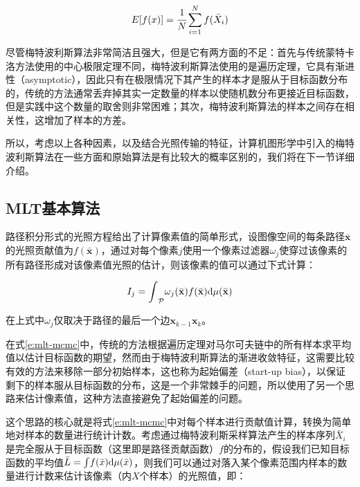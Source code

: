 \begin{equation}\label{e:mlt-mcmc}
	E[f(x)]= \cfrac{1}{N}\sum^{N}_{i=1}f(\bar{X}_i)
\end{equation}

尽管梅特波利斯算法非常简洁且强大，但是它有两方面的不足：首先与传统蒙特卡洛方法使用的中心极限定理不同，梅特波利斯算法使用的是遍历定理，它具有渐进性（asymptotic），因此只有在极限情况下其产生的样本才是服从于目标函数分布的，传统的方法通常丢弃掉其实一定数量的样本以使随机数分布更接近目标函数，但是实践中这个数量的取舍则非常困难；其次，梅特波利斯算法的样本之间存在相关性，这增加了样本的方差。

所以，考虑以上各种因素，以及结合光照传输的特征，计算机图形学中引入的梅特波利斯算法在一些方面和原始算法是有比较大的概率区别的，我们将在下一节详细介绍。






\subsection{MLT基本算法}\label{sec:mlt-algorithm}
路径积分形式的光照方程给出了计算像素值的简单形式，设图像空间的每条路径$\bar{\mathbf{x}}$的光照贡献值为$f(\bar{\mathbf{x}})$，通过对每个像素$j$使用一个像素过滤器$\omega_j$使穿过该像素的所有路径形成对该像素值光照的估计，则该像素的值可以通过下式计算：

\begin{equation}
	I_j={\rm \int}_{\mathcal{P}}\omega_j(\bar{\mathbf{x}})f(\bar{\mathbf{x}}){\rm d}\mu(\bar{\mathbf{x}})
\end{equation}

\noindent 在上式中$\omega_j$仅取决于路径的最后一个边$\mathbf{x}_{k-1}\mathbf{x}_{k}$。

在式\ref{e:mlt-mcmc}中，传统的方法根据遍历定理对马尔可夫链中的所有样本求平均值以估计目标函数的期望，然而由于梅特波利斯算法的渐进收敛特征，这需要比较有效的方法来移除一部分初始样本，这也称为起始偏差（start-up bias），以保证剩下的样本服从目标函数的分布，这是一个非常棘手的问题，所以\cite{a:MetropolisLightTransport}使用了另一个思路来估计像素值，这种方法直接避免了起始偏差的问题。

这个思路的核心就是将式\ref{e:mlt-mcmc}中对每个样本进行贡献值计算，转换为简单地对样本的数量进行统计计数。考虑通过梅特波利斯采样算法产生的样本序列$\bar{X}_i$是完全服从于目标函数（这里即是路径贡献函数）$f$的分布的，假设我们已知目标函数的平均值$\bar{L}={\rm \int} f(\bar{x}){\rm d}\mu(\bar{x})$，则我们可以通过对落入某个像素范围内样本的数量进行计数来估计该像素（内$X$个样本）的光照值，即：

